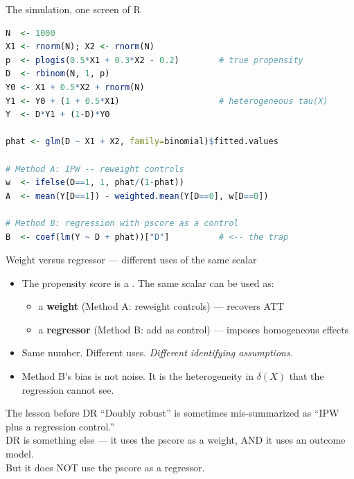 \documentclass[aspectratio=169,11pt]{beamer}
\begin{document}
\begin{frame}[fragile]{The simulation, one screen of R}
\vspace{0.1em}
\begin{lstlisting}[language=R,basicstyle=\ttfamily\scriptsize]
N  <- 1000
X1 <- rnorm(N); X2 <- rnorm(N)
p  <- plogis(0.5*X1 + 0.3*X2 - 0.2)        # true propensity
D  <- rbinom(N, 1, p)
Y0 <- X1 + 0.5*X2 + rnorm(N)
Y1 <- Y0 + (1 + 0.5*X1)                    # heterogeneous tau(X)
Y  <- D*Y1 + (1-D)*Y0

phat <- glm(D ~ X1 + X2, family=binomial)$fitted.values

# Method A: IPW -- reweight controls
w  <- ifelse(D==1, 1, phat/(1-phat))
A  <- mean(Y[D==1]) - weighted.mean(Y[D==0], w[D==0])

# Method B: regression with pscore as a control
B  <- coef(lm(Y ~ D + phat))["D"]          # <-- the trap
\end{lstlisting}
\end{frame}

\begin{frame}{Weight versus regressor --- different uses of the same scalar}
\vspace{0.4em}
\begin{itemize}
  \item The propensity score is a . The same scalar can be used as:
  \begin{itemize}\small
    \item[--] a \textbf{weight} (Method A: reweight controls) --- recovers ATT
    \item[--] a \textbf{regressor} (Method B: add as control) --- imposes homogeneous effects
  \end{itemize}
  \item Same number. Different uses. \textit{Different identifying assumptions.}
  \item Method B's bias is not noise. It is the heterogeneity in $\delta(X)$ that the regression cannot see.
\end{itemize}
\vspace{0.5em}
\begin{block}{The lesson before DR}
\small
``Doubly robust'' is sometimes mis-summarized as ``IPW plus a regression control.'' \\[0.2em]
 DR is something else --- it uses the pscore as a weight, AND it uses an outcome model. \\
But it does NOT use the pscore as a regressor.
\end{block}
\end{frame}
\end{document}

